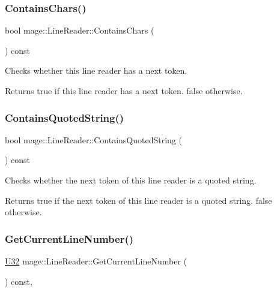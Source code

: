 \subsubsection{\texorpdfstring{Contains\+Chars()}{ContainsChars()}}
{\footnotesize\ttfamily bool mage\+::\+Line\+Reader\+::\+Contains\+Chars (\begin{DoxyParamCaption}{ }\end{DoxyParamCaption}) const\hspace{0.3cm}{\ttfamily [protected]}}

Checks whether this line reader has a next token.

\begin{DoxyReturn}{Returns}
{\ttfamily true} if this line reader has a next token. {\ttfamily false} otherwise. 
\end{DoxyReturn}
\hypertarget{classmage_1_1_line_reader_a99b4fa47fc341ad4fda112ea9505efcb}{}\label{classmage_1_1_line_reader_a99b4fa47fc341ad4fda112ea9505efcb} 
\subsubsection{\texorpdfstring{Contains\+Quoted\+String()}{ContainsQuotedString()}}
{\footnotesize\ttfamily bool mage\+::\+Line\+Reader\+::\+Contains\+Quoted\+String (\begin{DoxyParamCaption}{ }\end{DoxyParamCaption}) const\hspace{0.3cm}{\ttfamily [protected]}}

Checks whether the next token of this line reader is a quoted string.

\begin{DoxyReturn}{Returns}
{\ttfamily true} if the next token of this line reader is a quoted string. {\ttfamily false} otherwise. 
\end{DoxyReturn}
\hypertarget{classmage_1_1_line_reader_aa0ed768e2799b74f2341c56fc6ac4969}{}\label{classmage_1_1_line_reader_aa0ed768e2799b74f2341c56fc6ac4969} 
\subsubsection{\texorpdfstring{Get\+Current\+Line\+Number()}{GetCurrentLineNumber()}}
{\footnotesize\ttfamily \hyperlink{namespacemage_a41c104c036fba3756a74e19f793eeaa1}{U32} mage\+::\+Line\+Reader\+::\+Get\+Current\+Line\+Number (\begin{DoxyParamCaption}{ }\end{DoxyParamCaption}) const\hspace{0.3cm}{\ttfamily [protected]}, {\ttfamily [noexcept]}}

